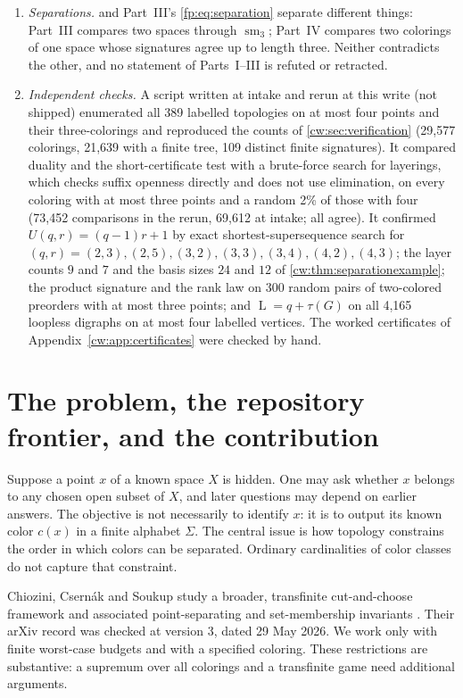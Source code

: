 \documentclass[11pt,letterpaper]{article}
\numberwithin{equation}{section}
\theoremstyle{definition}
\theoremstyle{remark}
\theoremstyle{definition}
\newcommand{\sm}{\operatorname{sm}}
\newcommand{\layers}{\operatorname{L}}
\begin{document}
\begin{enumerate}
(chains $01$ and $10$) is the finite-poset form of the clash of orientations behind Part~I's counterexample (\cref{sec:small}).
\item \emph{Separations.}  and Part~III's
\eqref{fp:eq:separation} separate different things: Part~III compares two
spaces through $\sm_3$; Part~IV compares two colorings of one space whose
signatures agree up to length three. Neither contradicts the other, and no
statement of Parts~I--III is refuted or retracted.
\item \emph{Independent checks.} A script written at intake and rerun at this
write (not shipped) enumerated all 389 labelled topologies on at most four
points and their three-colorings and reproduced the counts of
\cref{cw:sec:verification} (29,577 colorings, 21,639 with a finite tree, 109
distinct finite signatures). It compared duality and the short-certificate
test with a brute-force search for layerings, which checks suffix openness
directly and does not use elimination, on every coloring with at most three
points and a random 2\% of those with four (73,452 comparisons in the rerun,
69,612 at intake; all agree). It confirmed $U(q,r)=(q-1)r+1$ by exact
shortest-supersequence search for $(q,r)=(2,3),(2,5),(3,2),(3,3),(3,4),(4,2),(4,3)$;
the layer counts $9$ and $7$ and the basis sizes $24$ and $12$ of
\cref{cw:thm:separationexample}; the product signature and the rank law on
300 random pairs of two-colored preorders with at most three points; and
$\layers=q+\tau(G)$ on all 4,165 loopless digraphs on at most four labelled
vertices. The worked certificates of Appendix~\ref{cw:app:certificates} were
checked by hand.
\end{enumerate}

\section{The problem, the repository frontier, and the contribution}
\label{cw:sec:introduction}

Suppose a point $x$ of a known space $X$ is hidden. One may ask whether $x$
belongs to any chosen open subset of $X$, and later questions may depend on
earlier answers. The objective is not necessarily to identify $x$: it is to
output its known color $c(x)$ in a finite alphabet $\Sigma$.
The central issue is how topology constrains the order in which colors can
be separated. Ordinary cardinalities of color classes do not capture that
constraint.

Chiozini, Csern\'ak and Soukup study a broader, transfinite cut-and-choose
framework and associated point-separating and set-membership invariants
\cite{CCS}. Their arXiv record was checked at version 3, dated 29 May 2026.
We work only with finite worst-case budgets and with a specified coloring.
These restrictions are substantive: a supremum over all colorings and a
transfinite game need additional arguments.
\end{document}
